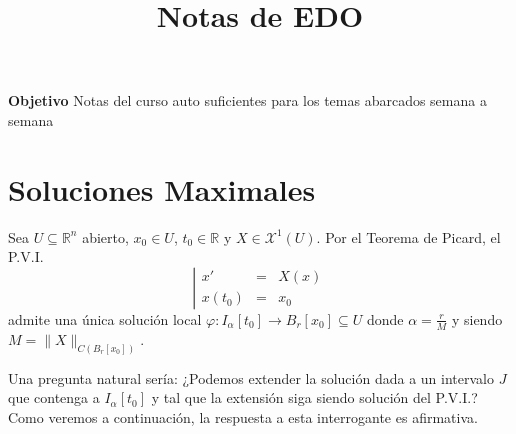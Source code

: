 \documentclass[11pt,a4paper]{article}
\title{\textbf{Notas de EDO}}
\author{}
\date{}
\theoremstyle{definition}
\theoremstyle{plain}
\theoremstyle{remark}
\begin{document}
	\maketitle
	\textbf{Objetivo}
	Notas del curso auto suficientes para los temas abarcados semana a semana
	\section{Soluciones Maximales}
	Sea $U \subseteq \mathbb{R}^n$ abierto, $x_0 \in U$, $t_0 \in \mathbb{R}$ y $X \in \mathcal{X}^1(U)$. Por el Teorema de Picard, el P.V.I.
	\begin{equation*}
		\left| 
		\begin{array}{lcl}
			x' &=& X(x) \\
			x(t_0) &=& x_0
		\end{array}
		\right.
	\end{equation*}
	admite una única solución local $\varphi : I_\alpha[t_0] \to B_r[x_0] \subseteq U$ donde $\alpha = \frac{r}{M}$ y siendo $M = \|X\|_{C(B_r[x_0])}$.
	
	Una pregunta natural sería: ¿Podemos extender la solución dada a un intervalo $J$ que contenga a $I_\alpha[t_0]$ y tal que la extensión siga siendo solución del P.V.I.? Como veremos a continuación, la respuesta a esta interrogante es afirmativa.
	
\end{document}
